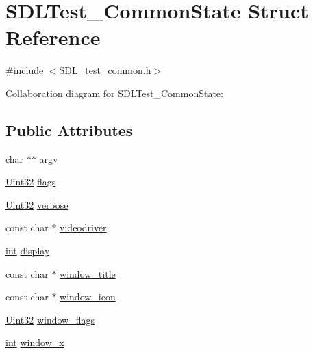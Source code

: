 \hypertarget{struct_s_d_l_test___common_state}{\section{S\-D\-L\-Test\-\_\-\-Common\-State Struct Reference}
\label{struct_s_d_l_test___common_state}
}


{\ttfamily \#include $<$S\-D\-L\-\_\-test\-\_\-common.\-h$>$}



Collaboration diagram for S\-D\-L\-Test\-\_\-\-Common\-State\-:
\subsection*{Public Attributes}
\begin{DoxyCompactItemize}
\item 
char $\ast$$\ast$ \hyperlink{struct_s_d_l_test___common_state_a6db840410b86ab7c6807763fd8bcb081}{argv}
\item 
\hyperlink{_s_d_l__stdinc_8h_add440eff171ea5f55cb00c4a9ab8672d}{Uint32} \hyperlink{struct_s_d_l_test___common_state_a97272d03558f1f74e579ec8a5cdabc5e}{flags}
\item 
\hyperlink{_s_d_l__stdinc_8h_add440eff171ea5f55cb00c4a9ab8672d}{Uint32} \hyperlink{struct_s_d_l_test___common_state_aad4b8ebf6277cd9d3608d2e1b48e4678}{verbose}
\item 
const char $\ast$ \hyperlink{struct_s_d_l_test___common_state_ab3face917946465c60dc0f38f179534d}{videodriver}
\item 
\hyperlink{_s_d_l__thread_8h_a6a64f9be4433e4de6e2f2f548cf3c08e}{int} \hyperlink{struct_s_d_l_test___common_state_addb3de8e2b278deed8d2309bafd30758}{display}
\item 
const char $\ast$ \hyperlink{struct_s_d_l_test___common_state_a86640ebac0afe0c504c3c324d84dcc37}{window\-\_\-title}
\item 
const char $\ast$ \hyperlink{struct_s_d_l_test___common_state_ac9e981b2b60a59f995153c74242d9d43}{window\-\_\-icon}
\item 
\hyperlink{_s_d_l__stdinc_8h_add440eff171ea5f55cb00c4a9ab8672d}{Uint32} \hyperlink{struct_s_d_l_test___common_state_a9e38339b34b483087ff8d52d44a80809}{window\-\_\-flags}
\item 
\hyperlink{_s_d_l__thread_8h_a6a64f9be4433e4de6e2f2f548cf3c08e}{int} \hyperlink{struct_s_d_l_test___common_state_a5413ab562164642b3e6ee97ab5d938bf}{window\-\_\-x}
\item 
$$
\end{DoxyCompactItemize}
